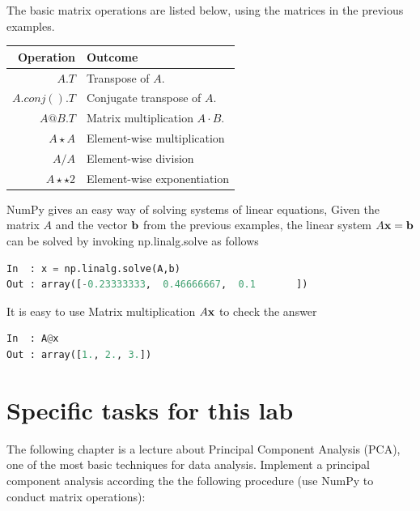 The basic matrix operations are listed below, using the matrices in the previous examples. 
\vs

\begin{tabular}{r|l}
Operation 		& Outcome \\
\hline
$A.T$ 	&  Transpose of $A$.\\
$A.conj().T$ 	&  Conjugate transpose of $A$.\\
$A@B.T$ 			&  Matrix multiplication $A \cdot B$. \\
$A\star A$ 		&  Element-wise multiplication\\
$A/A$ 		&  Element-wise division\\
$A\star\star 2$ 		&  Element-wise exponentiation\\
\hline
\end{tabular}

\vs

NumPy gives an easy way of solving systems of linear equations, Given the matrix $A$ and the vector $\textbf{b}$ from the previous examples, the linear system $A\textbf{x} = \textbf{b}$ can be solved by invoking {\s np.linalg.solve} as follows

\begin{lstlisting}[language=Python]
In 	: x = np.linalg.solve(A,b)
Out : array([-0.23333333,  0.46666667,  0.1       ])
\end{lstlisting}

It is easy to use Matrix multiplication $A\textbf{x}$ to check the answer

\begin{lstlisting}[language=Python]
In 	: A@x
Out : array([1., 2., 3.])
\end{lstlisting}


\section{Specific tasks for this lab}
The following chapter is a lecture about Principal Component Analysis (PCA), one of the most basic techniques for data analysis. Implement a principal component analysis according the the following procedure (use NumPy to conduct matrix operations):

